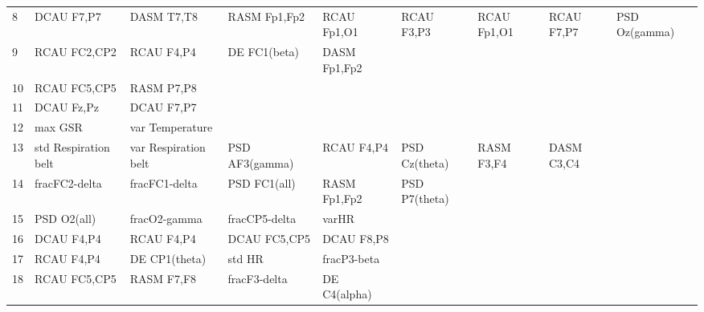 \begin{landscape}
\begin{table}[]
\begin{tabular}{l|llllllll}
8                  & DCAU F7,P7           & DASM T7,T8              & RASM Fp1,Fp2         & RCAU Fp1,O1        & RCAU F3,P3            & RCAU Fp1,O1          & RCAU F7,P7      & PSD Oz(gamma)   \\
9                  & RCAU FC2,CP2         & RCAU F4,P4              & DE FC1(beta)         & DASM Fp1,Fp2       &                       &                      &                 &                 \\
10                 & RCAU FC5,CP5         & RASM P7,P8              &                      &                    &                       &                      &                 &                 \\
11                 & DCAU Fz,Pz           & DCAU F7,P7              &                      &                    &                       &                      &                 &                 \\
12                 & max GSR              & var Temperature         &                      &                    &                       &                      &                 &                 \\
13                 & std Respiration belt & var Respiration belt    & PSD AF3(gamma)       & RCAU F4,P4         & PSD Cz(theta)         & RASM F3,F4           & DASM C3,C4      &                 \\
14                 & fracFC2-delta        & fracFC1-delta           & PSD FC1(all)         & RASM Fp1,Fp2       & PSD P7(theta)         &                      &                 &                 \\
15                 & PSD O2(all)          & fracO2-gamma            & fracCP5-delta        & varHR              &                       &                      &                 &                 \\
16                 & DCAU F4,P4           & RCAU F4,P4              & DCAU FC5,CP5         & DCAU F8,P8         &                       &                      &                 &                 \\
17                 & RCAU F4,P4           & DE CP1(theta)           & std HR               & fracP3-beta        &                       &                      &                 &                 \\
18                 & RCAU FC5,CP5         & RASM F7,F8              & fracF3-delta         & DE C4(alpha)       &                       &                      &                 &                 \\

\end{tabular}
\end{table}
\end{landscape}
